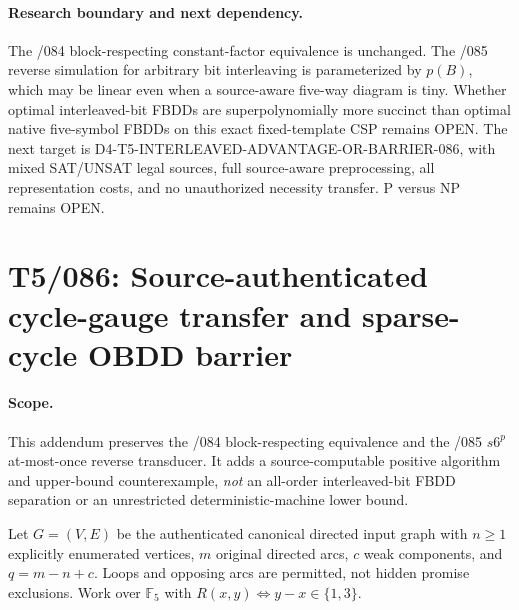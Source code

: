 \documentclass[11pt]{article}
\begin{document}
\paragraph{Research boundary and next dependency.}
The /084 block-respecting constant-factor equivalence is unchanged.
The /085 reverse simulation for arbitrary bit interleaving is
parameterized by $p(B)$, which may be linear even when a source-aware
five-way diagram is tiny. Whether optimal interleaved-bit FBDDs are
superpolynomially more succinct than optimal native five-symbol FBDDs
on this exact fixed-template CSP remains OPEN.
The next target is D4-T5-INTERLEAVED-ADVANTAGE-OR-BARRIER-086, with mixed
SAT/UNSAT legal sources, full source-aware preprocessing, all
representation costs, and no unauthorized necessity transfer.
P versus NP remains OPEN.



\section{T5/086: Source-authenticated cycle-gauge transfer and sparse-cycle OBDD barrier}
\label{sec:t5cycle086}
\paragraph{Scope.}
This addendum preserves the /084 block-respecting equivalence and the
/085 $s6^p$ at-most-once reverse transducer. It adds a
source-computable positive algorithm and upper-bound counterexample,
\emph{not} an all-order interleaved-bit FBDD separation or an
unrestricted deterministic-machine lower bound.

Let $G=(V,E)$ be the authenticated canonical directed input graph with
$n\ge1$ explicitly enumerated vertices, $m$ original directed arcs,
$c$ weak components, and $q=m-n+c$. Loops and opposing arcs are permitted,
not hidden promise exclusions. Work over $\mathbb F_5$ with
$R(x,y)\iff y-x\in\{1,3\}$.
\end{document}
